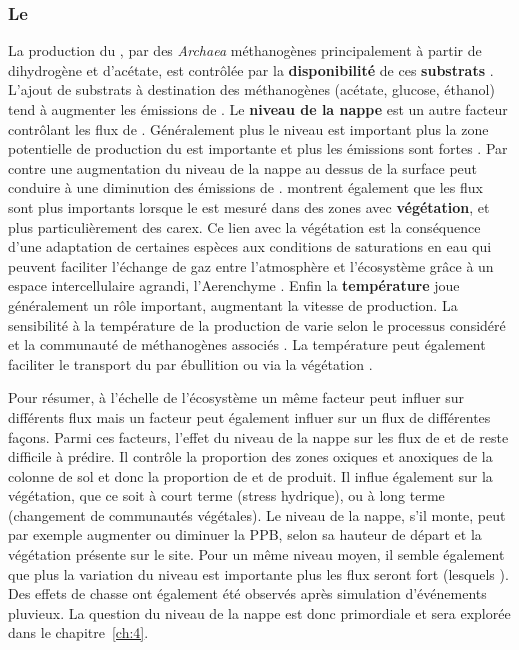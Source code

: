 \subsubsection{Le \chh}

La production du \chh, par des \textit{Archaea} méthanogènes principalement à partir de dihydrogène et d'acétate, est contrôlée par la \textbf{disponibilité} de ces \textbf{substrats} \citep{segers1998}.
L'ajout de substrats à destination des méthanogènes (acétate, glucose, éthanol) tend à augmenter les émissions de \chh \citep{coles2002}.
Le \textbf{niveau de la nappe} est un autre facteur contrôlant les flux de \chh.
Généralement plus le niveau est important plus la zone potentielle de production du \chh est importante et plus les émissions sont fortes \citep{pelletier2007}.
Par contre une augmentation du niveau de la nappe au dessus de la surface peut conduire à une diminution des émissions de \chh \citep{bubier1995}.
\citet{pelletier2007} montrent également que les flux sont plus importants lorsque le \chh est mesuré dans des zones avec \textbf{végétation}, et plus particulièrement des carex.
Ce lien avec la végétation est la conséquence d'une adaptation de certaines espèces aux conditions de saturations en eau qui peuvent faciliter l'échange de gaz entre l'atmosphère et l'écosystème grâce à un espace intercellulaire agrandi, l'Aerenchyme \citep{rydin2013d}.
Enfin la \textbf{température} joue généralement un rôle important, augmentant la vitesse de production.
La sensibilité à la température de la production de \chh varie selon le processus considéré et la communauté de méthanogènes associés \citep{segers1998}.
La température peut également faciliter le transport du \chh par ébullition ou via la végétation \citep{lai2009}.

Pour résumer, à l'échelle de l'écosystème un même facteur peut influer sur différents flux mais un facteur peut également influer sur un flux de différentes façons.
Parmi ces facteurs, l'effet du niveau de la nappe sur les flux de \coo et de \chh reste difficile à prédire.
Il contrôle la proportion des zones oxiques et anoxiques de la colonne de sol et donc la proportion de \coo et de \chh produit.
Il influe également sur la végétation, que ce soit à court terme (stress hydrique), ou à long terme (changement de communautés végétales).
Le niveau de la nappe, s'il monte, peut par exemple augmenter ou diminuer la PPB, selon sa hauteur de départ et la végétation présente sur le site.
Pour un même niveau moyen, il semble également que plus la variation du niveau est importante plus les flux seront fort (lesquels \plop).
Des effets de chasse ont également été observés après simulation d’événements pluvieux.
La question du niveau de la nappe est donc primordiale et sera explorée dans le chapitre~\ref{ch:4}.


